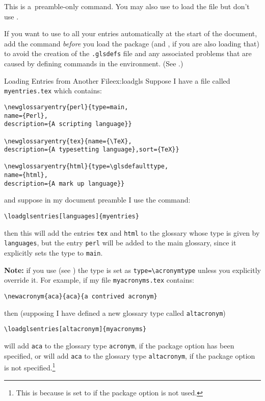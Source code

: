 \documentclass[report,inlinetitle]{nlctdoc}
\begin{document}
This is a~preamble-only command. You may also use  to load
the file but don't use .

\begin{important}
If you want to use  to  all your entries
automatically at the start of the document, add the
 command \emph{before} you load the
 package (and , if you are also loading
that) to avoid the creation of the
\texttt{.glsdefs} file and any associated problems that are caused
by defining commands in the  environment.
(See .)
\end{important}

\begin{example}{Loading Entries from Another File}{ex:loadgls}
Suppose I have a file called \texttt{myentries.tex} which contains:
\begin{verbatim}
\newglossaryentry{perl}{type=main,
name={Perl},
description={A scripting language}}

\newglossaryentry{tex}{name={\TeX},
description={A typesetting language},sort={TeX}}

\newglossaryentry{html}{type=\glsdefaulttype,
name={html},
description={A mark up language}}
\end{verbatim}
and suppose in my document preamble I use the command:
\begin{verbatim}
\loadglsentries[languages]{myentries}
\end{verbatim}
then this will add the entries \texttt{tex} and \texttt{html}
to the glossary whose type is given by \texttt{languages}, but
the entry \texttt{perl} will be added to the main glossary, since
it explicitly sets the type to \texttt{main}.
\end{example}

\textbf{Note:} if you use  (see
) the type is set as
\verb|type=\acronymtype| unless you explicitly override it. For
example, if my file \texttt{myacronyms.tex} contains:
\begin{verbatim}
\newacronym{aca}{aca}{a contrived acronym}
\end{verbatim}
then (supposing I have defined a new glossary type called
\texttt{altacronym})
\begin{verbatim}
\loadglsentries[altacronym]{myacronyms}
\end{verbatim}
will add \texttt{aca} to the glossary type \texttt{acronym}, if the
package option  has been specified, or will add
\texttt{aca} to the glossary type \texttt{altacronym}, if the
package option  is not specified.\footnote{This is
because  is set to  if the
 package option is not used.}
\end{document}
